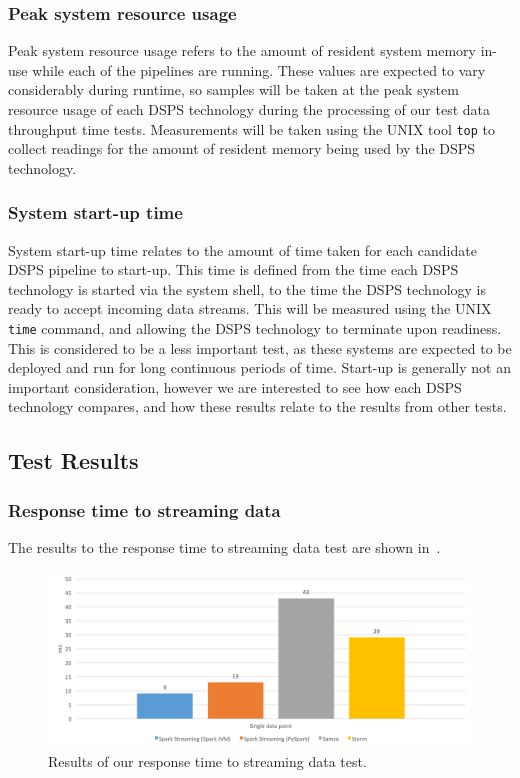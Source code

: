 \subsubsection{Peak system resource usage}

Peak system resource usage refers to the amount of resident system memory in-use while each of the pipelines are running.
These values are expected to vary considerably during runtime, so samples will be taken at the peak system resource usage of each DSPS
technology during the processing of our test data throughput time tests.
Measurements will be taken using the UNIX tool \texttt{top} to collect readings for the amount of resident memory being used
by the DSPS technology.

\subsubsection{System start-up time}

System start-up time relates to the amount of time taken for each candidate DSPS pipeline to start-up. This time is
defined from the time each DSPS technology is started via the system shell, to the time the DSPS technology is
ready to accept incoming data streams. This will be measured using the UNIX \texttt{time} command, and allowing the
DSPS technology to terminate upon readiness. This is considered to be a less important test, as these systems are expected
to be deployed and run for long continuous periods of time. Start-up is generally not an important consideration, however
we are interested to see how each DSPS technology compares, and how these results relate to the results from other tests.



\subsection{Test Results} %
\label{sub:test_results}

\subsubsection{Response time to streaming data}

The results to the response time to streaming data test are shown in~.

\begin{figure}[H]
  \centering
  \includegraphics[width=1\textwidth]{includes/figures/fig_response_time_res}
  \caption{Results of our response time to streaming data test.}
  \label{fig:response_time_res}
\end{figure}

